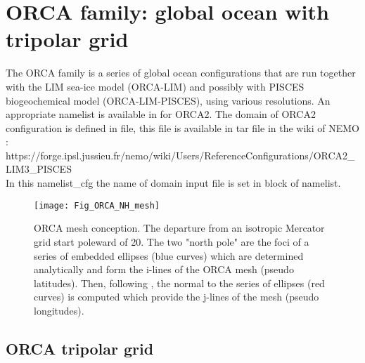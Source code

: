 \documentclass[../tex_main/NEMO_manual]{subfiles}
\begin{document}

\section{ORCA family: global ocean with tripolar grid}
\label{sec:CFG_orca}

The ORCA family is a series of global ocean configurations that are run together with 
the LIM sea-ice model (ORCA-LIM) and possibly with PISCES biogeochemical model 
(ORCA-LIM-PISCES), using various resolutions.
An appropriate namelist is available in  
for ORCA2.
The domain of ORCA2 configuration is defined in  file, this file is available in tar file in the wiki of NEMO : \\
https://forge.ipsl.jussieu.fr/nemo/wiki/Users/ReferenceConfigurations/ORCA2\_LIM3\_PISCES \\
In this namelist\_cfg the name of domain input file is set in  block of namelist. 

\begin{figure}[!t]   \begin{center}
\texttt{[image: Fig\_ORCA\_NH\_mesh]}
\caption{  \protect\label{fig:MISC_ORCA_msh}     
ORCA mesh conception. The departure from an isotropic Mercator grid start poleward of 20\degN.
The two "north pole" are the foci of a series of embedded ellipses (blue curves) 
which are determined analytically and form the i-lines of the ORCA mesh (pseudo latitudes). 
Then, following \citet{Madec_Imbard_CD96}, the normal to the series of ellipses (red curves) is computed 
which provide the j-lines of the mesh (pseudo longitudes).  }
\end{center}   \end{figure}

\subsection{ORCA tripolar grid}
\label{subsec:CFG_orca_grid}
\end{document}
